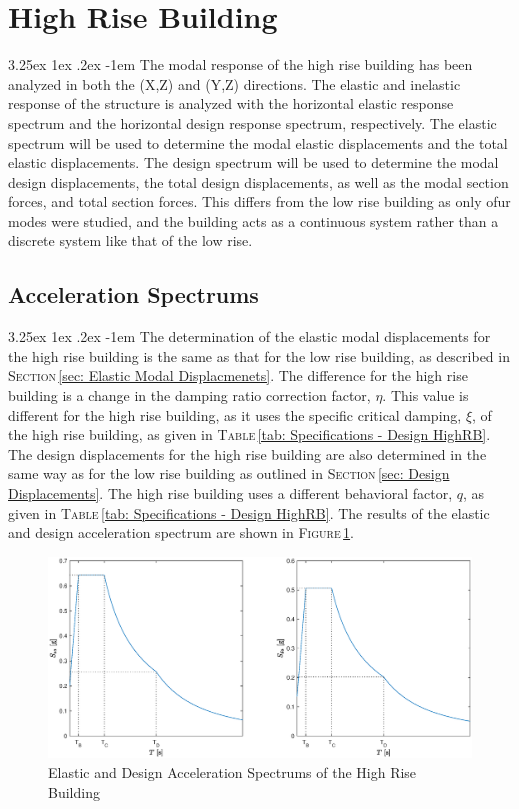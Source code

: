 \documentclass[11pt,a4paper,titlepage]{report}
\makeatletter
\renewcommand\paragraph{\@startsection{paragraph}{5}{\z@}%
  {3.25ex \@plus1ex \@minus.2ex}%
  {-1em}%
  {\normalfont\normalsize\bfseries}}
\makeatother
\begin{document}
\section{High Rise Building}
\paragraph{}The modal response of the high rise building has been analyzed in both the (X,Z) and (Y,Z) directions. The elastic and inelastic response of the structure is analyzed with the horizontal elastic response spectrum and the horizontal design response spectrum, respectively. The elastic spectrum will be used to determine the modal elastic displacements and the total elastic displacements. The design spectrum will be used to determine the modal design displacements, the total design displacements, as well as the modal section forces, and total section forces. This differs from the low rise building as only ofur modes were studied, and the building acts as a continuous system rather than a discrete system like that of the low rise. 

\subsection{Acceleration Spectrums}
\paragraph{}The determination of the elastic modal displacements for the high rise building is the same as that for the low rise building, as described in \textsc{Section}\,\ref{sec: Elastic Modal Displacmenets}. The difference for the high rise building is a change in the damping ratio correction factor, $\eta$. This value is different for the high rise building, as it uses the specific critical damping, $\xi$, of the high rise building, as given in \textsc{Table}\,\ref{tab: Specifications - Design HighRB}. The design displacements for the high rise building are also determined in the same way as for the low rise building as outlined in \textsc{Section}\,\ref{sec: Design Displacements}. The high rise building uses a different behavioral factor, $q$, as given in \textsc{Table}\,\ref{tab: Specifications - Design HighRB}. The results of the elastic and design acceleration spectrum are shown in \textsc{Figure}\,\ref{fig:I.2 - acceleration spectrum HR}. 
\begin{figure}
    \centering
    \includegraphics[width=16cm]{Acceleration_Spectrum_HR.eps}
    \caption{Elastic and Design Acceleration Spectrums of the High Rise Building}
    \label{fig:I.2 - acceleration spectrum HR}
\end{figure}
\end{document}
